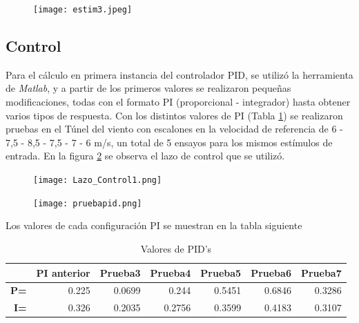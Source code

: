 \begin{figure}[H]
	\centering
	\texttt{[image: estim3.jpeg]}
	\label{fig:estim3}
\end{figure}
       
    \subsection{Control}
    Para el cálculo en primera instancia del controlador PID, se utilizó la herramienta de \textit{Matlab}, y a partir de los primeros valores se realizaron pequeñas modificaciones, todas con el formato PI (proporcional - integrador) hasta obtener varios tipos de respuesta.
    Con los distintos valores de PI (Tabla \ref{tab:pid}) se realizaron pruebas en el Túnel del viento con escalones en la velocidad de referencia de 6 - 7,5 - 8,5 - 7,5 - 7 - 6 m/s,  un total de 5 ensayos para los mismos estímulos de entrada. En la figura \ref{fig:Lazo_Control} se observa el lazo de control que se utilizó. 
   
    \begin{figure}[H]
   	\centering
   	\texttt{[image: Lazo\_Control1.png]}
   	\label{fig:Lazo_Control}
   \end{figure}
    \begin{figure}[H]
    	\centering
    	\texttt{[image: pruebapid.png]}
    	\label{fig:PI3}
    \end{figure}
    
    Los valores de cada configuración PI se muestran en la tabla siguiente
    \begin{table}[H]
    	\centering
    	\begin{tabular}{r|r|r|r|r|r|r|}
    		\cline{2-7}
    		\multicolumn{1}{l|}{} & \multicolumn{1}{c|}{\textbf{PI anterior}} & \multicolumn{1}{c|}{\textbf{Prueba3}} & \multicolumn{1}{c|}{\textbf{Prueba4}} & \multicolumn{1}{c|}{\textbf{Prueba5}} & \multicolumn{1}{c|}{\textbf{Prueba6}} & \multicolumn{1}{c|}{\textbf{Prueba7}} \\ \hline
    		\multicolumn{1}{|r|}{\textbf{P=}} & 0.225 & 0.0699 & 0.244 & 0.5451 & 0.6846 & 0.3286 \\ \hline
    		\multicolumn{1}{|r|}{\textbf{I=}} & 0.326 & 0.2035 & 0.2756 & 0.3599 & 0.4183 & 0.3107 \\ \hline
    	\end{tabular}
    \caption{Valores de PID's}
    \label{tab:pid}
    \end{table}
    
